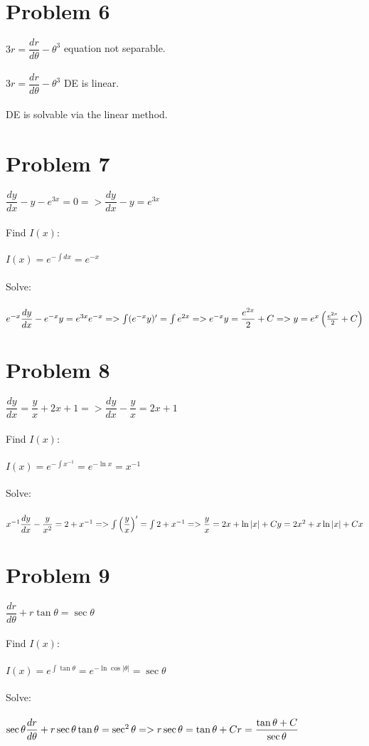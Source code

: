 \documentclass[12pt]{exam}
\begin{document}
\section*{Problem 6}
$3r=\dfrac{dr}{d\theta}-\theta^3$ equation not separable. \\\\
$3r=\dfrac{dr}{d\theta}-\theta^3$ DE is linear.\\\\
DE is solvable via the linear method.
\section*{Problem 7}
$\dfrac{dy}{dx}-y-e^{3x}=0=>\dfrac{dy}{dx}-y=e^{3x}$\\\\
Find $I(x)$:\\\\
$I(x)=e^{-\int dx}=e^{-x}$\\\\
Solve:\\\\
$e^{-x}\dfrac{dy}{dx}-e^{-x}y=e^{3x}e^{-x}=>\int(e^{-x}y)'=\int e^{2x}=>e^{-x}y=\dfrac{e^{2x}}{2}+C=>\\\\y=e^x\left(\frac{e^{2x}}{2}+C\right)$
\section*{Problem 8}
$\dfrac{dy}{dx}=\dfrac{y}{x}+2x+1=>\dfrac{dy}{dx}-\dfrac{y}{x}=2x+1$\\\\
Find $I(x)$:\\\\
$I(x)=e^{-\int x^{-1}}=e^{-\ln{x}}=x^{-1}$\\\\
Solve:\\\\
$x^{-1}\dfrac{dy}{dx}-\dfrac{y}{x^2}=2+x^{-1}=>\int\left(\dfrac{y}{x}\right)'=\int 2+x^{-1}=>\dfrac{y}{x}=2x+\ln{|x|}+C\\\\y=2x^2+x\ln{|x|}+Cx$
\section*{Problem 9}
$\dfrac{dr}{d\theta}+r\tan{\theta}=\sec{\theta}$\\\\
Find $I(x)$:\\\\
$I(x)=e^{\int\tan{\theta}}=e^{-\ln{\cos{|\theta|}}}=\sec{\theta}$\\\\
Solve:\\\\
$\sec{\theta}\dfrac{dr}{d\theta}+r\sec{\theta}\tan{\theta}=\sec^2{\theta}=>r\sec{\theta}=\tan{\theta}+C\\\\r=\dfrac{\tan{\theta}+C}{\sec{\theta}}$
\end{document}
